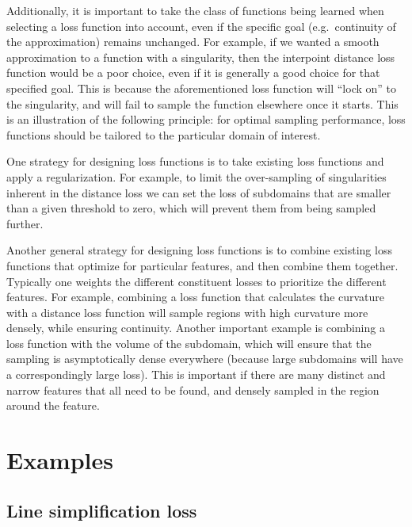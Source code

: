 
Additionally, it is important to take the class of functions being learned when selecting a loss function into account, even if the specific goal (e.g.~continuity of the approximation) remains unchanged.
For example, if we wanted a smooth approximation to a function with a singularity, then the interpoint distance loss function would be a poor choice, even if it is generally a good choice for that specified goal.
This is because the aforementioned loss function will ``lock on'' to the singularity, and will fail to sample the function elsewhere once it starts.
This is an illustration of the following principle: for optimal sampling performance, loss functions should be tailored to the particular domain of interest.


One strategy for designing loss functions is to take existing loss functions and apply a regularization.
For example, to limit the over-sampling of singularities inherent in the distance loss we can set the loss of subdomains that are smaller than a given threshold to zero, which will prevent them from being sampled further.


Another general strategy for designing loss functions is to combine existing loss functions that optimize for particular features, and then combine them together.
Typically one weights the different constituent losses to prioritize the different features.
For example, combining a loss function that calculates the curvature with a distance loss function will sample regions with high curvature more densely, while ensuring continuity.
Another important example is combining a loss function with the volume of the subdomain, which will ensure that the sampling is asymptotically dense everywhere (because large subdomains will have a correspondingly large loss).
This is important if there are many distinct and narrow features that all need to be found, and densely sampled in the region around the feature.

\section{Examples}

\subsection{Line simplification loss}

